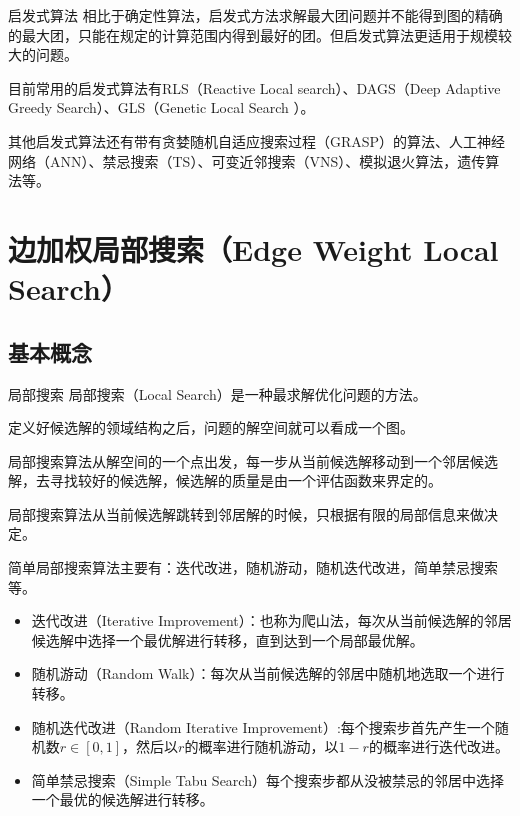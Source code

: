 \documentclass[9pt,dvipsnames,table,UTF8,aspectratio=169]{beamer}
\begin{document}
\begin{frame}{启发式算法}
	相比于确定性算法，启发式方法求解最大团问题并不能得到图的精确的最大团，只能在规定的计算范围内得到最好的团。但启发式算法更适用于规模较大的问题。

	目前常用的启发式算法有RLS（Reactive Local search）\footnotemark、DAGS（Deep Adaptive Greedy Search）\footnotemark、GLS（Genetic Local Search ）\footnotemark。

	其他启发式算法还有带有贪婪随机自适应搜索过程（GRASP）的算法、人工神经网络（ANN）、禁忌搜索（TS）、可变近邻搜索（VNS）、模拟退火算法，遗传算法等。 

\end{frame}

\section{边加权局部搜索（Edge Weight Local Search）}
\subsection{基本概念}
\begin{frame}{局部搜索}
	局部搜索（Local Search）是一种最求解优化问题的方法。
	
	定义好候选解的领域结构之后，问题的解空间就可以看成一个图。
	
	局部搜索算法从解空间的一个点出发，每一步从当前候选解移动到一个邻居候选解，去寻找较好的候选解，候选解的质量是由一个评估函数来界定的。

	局部搜索算法从当前候选解跳转到邻居解的时候，只根据有限的局部信息来做决定。
\end{frame}

\begin{frame}
	简单局部搜索算法主要有：迭代改进，随机游动，随机迭代改进，简单禁忌搜索等。
	\begin{itemize}
		\item 迭代改进（Iterative Improvement）：也称为爬山法，每次从当前候选解的邻居候选解中选择一个最优解进行转移，直到达到一个局部最优解。
		\item 随机游动（Random Walk）：每次从当前候选解的邻居中随机地选取一个进行转移。
		\item 随机迭代改进（Random Iterative Improvement）:每个搜索步首先产生一个随机数$r \in [0, 1]$，然后以$r$的概率进行随机游动，以$1 - r$的概率进行迭代改进。
		\item 简单禁忌搜索（Simple Tabu Search）每个搜索步都从没被禁忌的邻居中选择一个最优的候选解进行转移。
	\end{itemize}
\end{frame}
\end{document}
